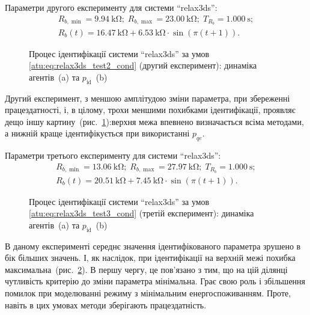 Параметри другого експерименту для системи ``relax3ds'':
%
\begin{equation}
  \begin{array}{c}
    R_{b,\min} = \SI{9.94}{\kilo\ohm};
    \;
    R_{b,\max} = \SI{23.00}{\kilo\ohm};
    \;
    T_{R_b} = \SI{1.000}{\second};
  \\
    R_b(t) = \SI{16.47}{\kilo\ohm} + \SI{6.53}{\kilo\ohm} \cdot \sin( \pi ( t + 1 ) ).
  \end{array}
  \label{atu:eq:relax3ds_test2_cond}
\end{equation}

\begin{figure}[htb!]
  \caption{Процес ідентифікації системи ``relax3ds'' за умов \ref{atu:eq:relax3ds_test2_cond} (другий експеримент): динаміка агентів~(a) та $p_\mathrm{id}$~(b)}
  \label{atu:f:relax3ds_id_1}
\end{figure}

Другий експеримент, з меншою амплітудою зміни параметра,
при збереженні працездатності, і, в цілому, трохи
меншими похибками ідентифікації, проявляє дещо іншу
картину~(рис.~\ref{atu:f:relax3ds_id_1}):верхня межа впевнено визначається
всіма методами, а нижній краще ідентифікується при використанні
$p_{qe}$.


Параметри третього експерименту для системи ``relax3ds'':
%
\begin{equation}
  \begin{array}{c}
    R_{b,\min} = \SI{13.06}{\kilo\ohm};
    \;
    R_{b,\max} = \SI{27.97}{\kilo\ohm};
    \;
    T_{R_b} = \SI{1.000}{\second};
  \\
    R_b(t) = \SI{20.51}{\kilo\ohm} + \SI{7.45}{\kilo\ohm} \cdot \sin( \pi ( t + 1 ) ).
  \end{array}
  \label{atu:eq:relax3ds_test3_cond}
\end{equation}

\begin{figure}[htb!]
  \caption{Процес ідентифікації системи ``relax3ds'' за умов \ref{atu:eq:relax3ds_test3_cond} (третій експеримент): динаміка агентів~(a) та $p_\mathrm{id}$~(b)}
  \label{atu:f:relax3ds_id_2}
\end{figure}

В даному експерименті середнє значення ідентифікованого
параметра зрушено в бік більших значень. І, як
наслідок, при ідентифікації на верхній межі похибка
максимальна~(рис.~\ref{atu:f:relax3ds_id_2}). В першу чергу, це пов'язано з
тим, що на цій ділянці чутливість критерію до зміни параметра
мінімальна. Грає свою роль і збільшення помилок при моделюванні
режиму з мінімальним енергоспоживанням. Проте, навіть в цих
умовах методи зберігають працездатність.


